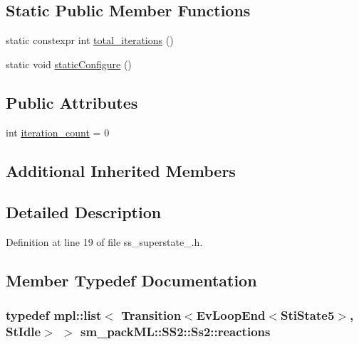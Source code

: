 \subsection*{Static Public Member Functions}
\begin{DoxyCompactItemize}
\item 
static constexpr int \hyperlink{structsm__packML_1_1SS2_1_1Ss2_a6002b83ede81b1d169a5a8e47625a983}{total\+\_\+iterations} ()
\item 
static void \hyperlink{structsm__packML_1_1SS2_1_1Ss2_a9c648782f049a3106bb61264b0a1d5d4}{static\+Configure} ()
\end{DoxyCompactItemize}
\subsection*{Public Attributes}
\begin{DoxyCompactItemize}
\item 
int \hyperlink{structsm__packML_1_1SS2_1_1Ss2_a6a77a9c2c285f7c9bab40225b9663bd8}{iteration\+\_\+count} = 0
\end{DoxyCompactItemize}
\subsection*{Additional Inherited Members}


\subsection{Detailed Description}


Definition at line 19 of file ss\+\_\+superstate\+\_.\+h.



\subsection{Member Typedef Documentation}
\subsubsection[{\texorpdfstring{reactions}{reactions}}]{\setlength{\rightskip}{0pt plus 5cm}typedef mpl\+::list$<$ Transition$<$Ev\+Loop\+End$<${\bf Sti\+State5}$>$, {\bf St\+Idle}$>$ $>$ {\bf sm\+\_\+pack\+M\+L\+::\+S\+S2\+::\+Ss2\+::reactions}}\hypertarget{structsm__packML_1_1SS2_1_1Ss2_a8507cd14b5a00a1b3abb7b8f9607517d}{}\label{structsm__packML_1_1SS2_1_1Ss2_a8507cd14b5a00a1b3abb7b8f9607517d}


